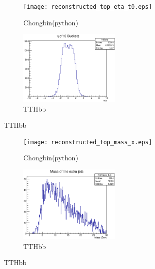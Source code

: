 \documentclass{beamer}
\begin{document}
\begin{frame}
  \begin{figure}[!h]
  \captionsetup[subfigure]{labelformat=empty}
  \begin{subfigure}{.5\textwidth}
  \centering
  \texttt{[image: reconstructed\_top\_eta\_t0.eps]}
  \caption{Chongbin(python)}
  \end{subfigure} \hfill
  \begin{subfigure}{.5\textwidth}
  \centering
  \includegraphics[width=5cm]{ht0eta_alljetregion.eps}
  \caption{TTHbb}
  \end{subfigure}
  \end{figure}
\end{frame}

\begin{frame}
  \begin{figure}[!h]
  \captionsetup[subfigure]{labelformat=empty}
  \begin{subfigure}{.5\textwidth}
  \centering
  \texttt{[image: reconstructed\_top\_mass\_x.eps]}
  \caption{Chongbin(python)}
  \end{subfigure} \hfill
  \begin{subfigure}{.5\textwidth}
  \centering
  \includegraphics[width=5cm]{hXmass_full_alljetregion.eps}
  \caption{TTHbb}
  \end{subfigure}
  \end{figure}
\end{frame}
\end{document}
